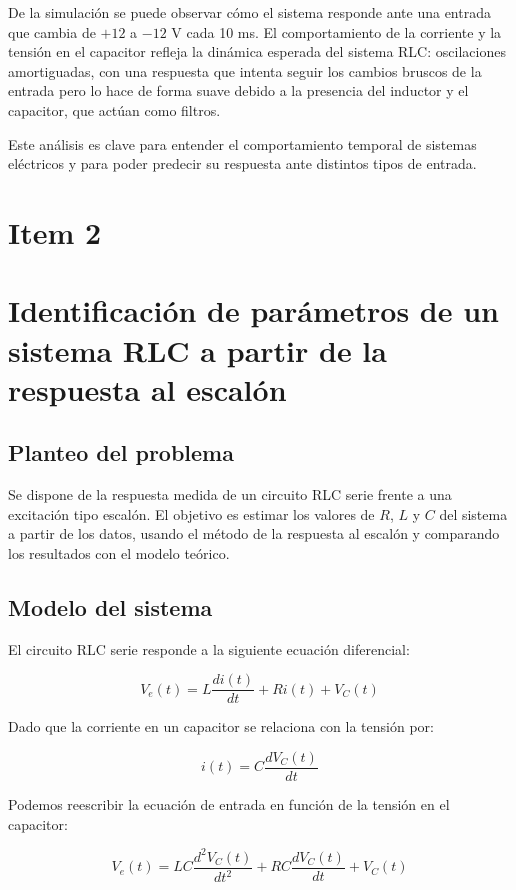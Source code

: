 \documentclass{article}
\begin{document}
De la simulación se puede observar cómo el sistema responde ante una entrada que cambia de $+12$ a $-12$ V cada 10 ms. El comportamiento de la corriente y la tensión en el capacitor refleja la dinámica esperada del sistema RLC: oscilaciones amortiguadas, con una respuesta que intenta seguir los cambios bruscos de la entrada pero lo hace de forma suave debido a la presencia del inductor y el capacitor, que actúan como filtros.

Este análisis es clave para entender el comportamiento temporal de sistemas eléctricos y para poder predecir su respuesta ante distintos tipos de entrada.

\section{Item 2}
\section*{Identificación de parámetros de un sistema RLC a partir de la respuesta al escalón}

\subsection*{Planteo del problema}
Se dispone de la respuesta medida de un circuito RLC serie frente a una excitación tipo escalón. El objetivo es estimar los valores de $R$, $L$ y $C$ del sistema a partir de los datos, usando el método de la respuesta al escalón y comparando los resultados con el modelo teórico.

\subsection*{Modelo del sistema}
El circuito RLC serie responde a la siguiente ecuación diferencial:

\begin{equation}
V_e(t) = L \frac{di(t)}{dt} + R i(t) + V_C(t)
\end{equation}

Dado que la corriente en un capacitor se relaciona con la tensión por:

\begin{equation}
i(t) = C \frac{dV_C(t)}{dt}
\end{equation}

Podemos reescribir la ecuación de entrada en función de la tensión en el capacitor:

\begin{equation}
V_e(t) = LC \frac{d^2V_C(t)}{dt^2} + RC \frac{dV_C(t)}{dt} + V_C(t)
\end{equation}
\end{document}
